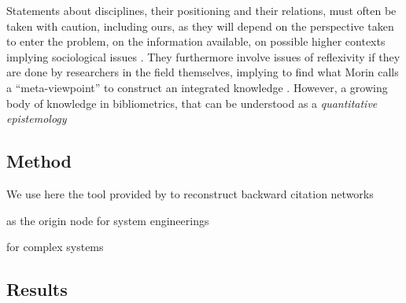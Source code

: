 \documentclass[runningheads,a4paper]{llncs2e/llncs}
\begin{document}
Statements about disciplines, their positioning and their relations, must often be taken with caution, including ours, as they will depend on the perspective taken to enter the problem, on the information available, on possible higher contexts implying sociological issues \cite{latour1977rhetorique}. They furthermore involve issues of reflexivity if they are done by researchers in the field themselves, implying to find what Morin calls a ``meta-viewpoint'' to construct an integrated knowledge \cite{edgar1986methode}. However, a growing body of knowledge in bibliometrics, that can be understood as a \emph{quantitative epistemology} \cite{chavalarias2013phylomemetic}

\cite{waltman2010unified}

\subsection{Method}

We use here the tool provided by \cite{raimbault2017exploration} to reconstruct backward citation networks


\cite{estefan2007survey} as the origin node for system engineerings

\cite{newman2011complex} for complex systems


\subsection{Results}







%




\end{document}
